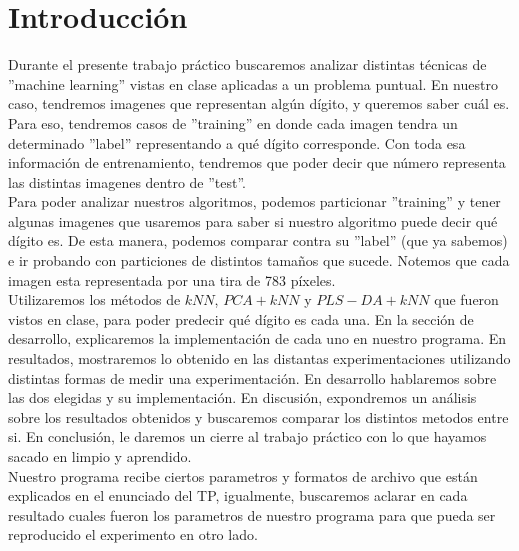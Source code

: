\section{Introducción}

Durante el presente trabajo pr\'actico buscaremos analizar distintas t\'ecnicas de ''machine learning'' vistas en clase aplicadas a un problema puntual. En nuestro caso, tendremos imagenes que representan alg\'un d\'igito, y queremos saber cu\'al es. Para eso, tendremos casos de ''training'' en donde cada imagen tendra un determinado ''label'' representando a qu\'e d\'igito corresponde. Con toda esa informaci\'on de entrenamiento, tendremos que poder decir que n\'umero representa las distintas imagenes dentro de ''test''.\\

Para poder analizar nuestros algoritmos, podemos particionar ''training'' y tener algunas imagenes que usaremos para saber si nuestro algoritmo puede decir qu\'e d\'igito es. De esta manera, podemos comparar contra su ''label'' (que ya sabemos) e ir probando con particiones de distintos tama\~nos que sucede. Notemos que cada imagen esta representada por una tira de 783 p\'ixeles.\\

Utilizaremos los m\'etodos de $kNN$, $PCA + kNN$ y $PLS-DA + kNN$ que fueron vistos en clase, para poder predecir qu\'e d\'igito es cada una. En la secci\'on de desarrollo, explicaremos la implementaci\'on de cada uno en nuestro programa. En resultados, mostraremos lo obtenido en las distantas experimentaciones utilizando distintas formas de medir una experimentaci\'on. En desarrollo hablaremos sobre las dos elegidas y su implementaci\'on. En discusi\'on, expondremos un an\'alisis sobre los resultados obtenidos y buscaremos comparar los distintos metodos entre si. En conclusi\'on, le daremos un cierre al trabajo pr\'actico con lo que hayamos sacado en limpio y aprendido.\\

Nuestro programa recibe ciertos parametros y formatos de archivo que est\'an explicados en el enunciado del TP, igualmente, buscaremos aclarar en cada resultado cuales fueron los parametros de nuestro programa para que pueda ser reproducido el experimento en otro lado.